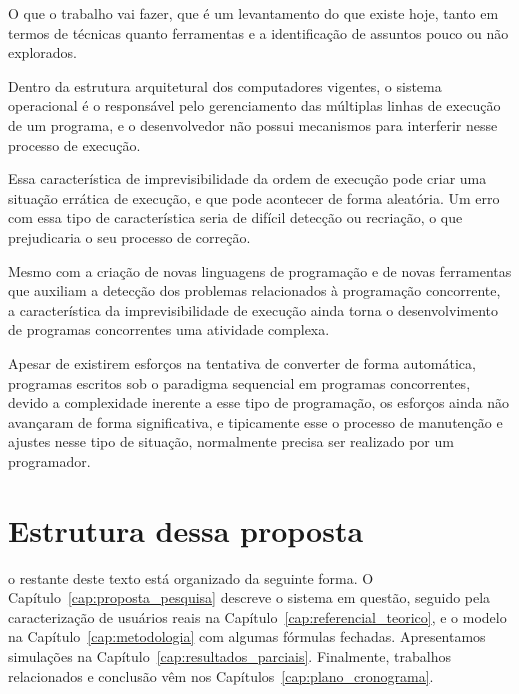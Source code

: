O que o trabalho vai fazer, que é um levantamento do que existe hoje, tanto em termos de técnicas quanto ferramentas e a identificação de assuntos pouco ou não explorados.


Dentro da estrutura arquitetural dos computadores vigentes, o sistema operacional é o responsável pelo gerenciamento das múltiplas linhas de execução de um  programa, e o desenvolvedor não possui mecanismos para interferir nesse processo de execução. 

Essa característica de imprevisibilidade da ordem de execução pode criar uma situação errática de execução, e que pode acontecer de forma aleatória. Um erro com essa tipo de característica seria de difícil detecção ou recriação, o que prejudicaria o seu processo de correção.

Mesmo com a criação de novas linguagens de programação e de novas ferramentas que auxiliam a detecção dos problemas relacionados à programação concorrente, a característica da imprevisibilidade de execução ainda torna o desenvolvimento de programas concorrentes uma atividade complexa.

Apesar de existirem esforços na tentativa de converter de  forma automática, programas escritos sob o paradigma sequencial em programas concorrentes, devido a complexidade inerente a esse tipo de programação, os esforços ainda não avançaram de forma significativa, e tipicamente esse o processo de manutenção e ajustes nesse tipo de situação, normalmente precisa ser realizado por um programador.


\section{Estrutura dessa proposta}
	o restante deste texto está organizado da seguinte forma. O Capítulo~\ref{cap:proposta_pesquisa} descreve o sistema em questão, seguido pela caracterização de usuários reais na Capítulo~\ref{cap:referencial_teorico}, e o modelo na Capítulo~\ref{cap:metodologia} com algumas fórmulas fechadas. Apresentamos simulações na Capítulo~\ref{cap:resultados_parciais}.   Finalmente, trabalhos relacionados e conclusão vêm nos Capítulos~\ref{cap:plano_cronograma}.